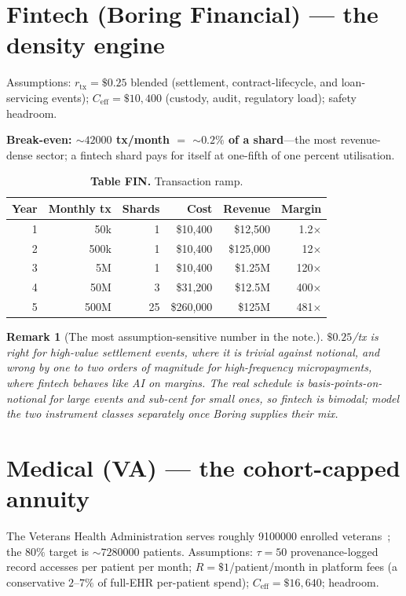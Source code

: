 \documentclass[11pt]{article}
\newtheorem{remark}{Remark}
\begin{document}
\section{Fintech (Boring Financial) --- the density engine}
\label{sec:fintech}

Assumptions: $r_{\text{tx}}=\$0.25$ blended (settlement, contract-lifecycle, and loan-servicing events); $C_{\text{eff}}=\$10{,}400$ (custody, audit, regulatory load); safety headroom.

\textbf{Break-even: ${\sim}\num{42000}$ tx/month ${=}$ ${\sim}0.2\%$ of a shard}---the most revenue-dense sector; a fintech shard pays for itself at one-fifth of one percent utilisation.

\begin{table}[h]
\centering
\caption*{\textbf{Table FIN.} Transaction ramp.}
\begin{tabular}{@{}rrrrrr@{}}
\toprule
Year & Monthly tx & Shards & Cost & Revenue & Margin \\
\midrule
1 & 50k   & 1  & \$10{,}400  & \$12{,}500  & 1.2$\times$ \\
2 & 500k  & 1  & \$10{,}400  & \$125{,}000 & 12$\times$ \\
3 & 5M    & 1  & \$10{,}400  & \$1.25M     & 120$\times$ \\
4 & 50M   & 3  & \$31{,}200  & \$12.5M     & 400$\times$ \\
5 & 500M  & 25 & \$260{,}000 & \$125M      & 481$\times$ \\
\bottomrule
\end{tabular}
\end{table}

\begin{remark}[The most assumption-sensitive number in the note.]
$\$0.25$/tx is right for high-value settlement events, where it is trivial against notional, and wrong by one to two orders of magnitude for high-frequency micropayments, where fintech behaves like AI on margins. The real schedule is basis-points-on-notional for large events and sub-cent for small ones, so fintech is bimodal; model the two instrument classes separately once Boring supplies their mix.
\end{remark}

\section{Medical (VA) --- the cohort-capped annuity}
\label{sec:medical}

The Veterans Health Administration serves roughly \num{9100000} enrolled veterans~\cite{vha2026}; the $80\%$ target is ${\sim}\num{7280000}$ patients. Assumptions: $\tau=50$ provenance-logged record accesses per patient per month; $R=\$1$/patient/month in platform fees (a conservative $2$--$7\%$ of full-EHR per-patient spend); $C_{\text{eff}}=\$16{,}640$; headroom.
\end{document}

